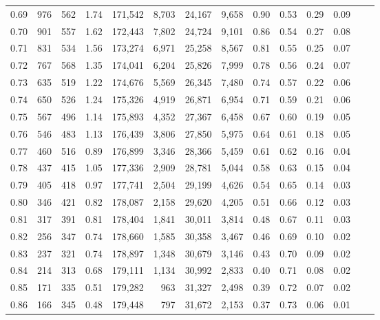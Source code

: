\begin{tabular}{rrrrrrrrrrrrrr}
0.69 &    976 &  562 &    1.74 &  171,542 &    8,703 &  24,167 &   9,658 &  0.90 &  0.53 &  0.29 &      0.09 \\
0.70 &    901 &  557 &    1.62 &  172,443 &    7,802 &  24,724 &   9,101 &  0.86 &  0.54 &  0.27 &      0.08 \\
0.71 &    831 &  534 &    1.56 &  173,274 &    6,971 &  25,258 &   8,567 &  0.81 &  0.55 &  0.25 &      0.07 \\
0.72 &    767 &  568 &    1.35 &  174,041 &    6,204 &  25,826 &   7,999 &  0.78 &  0.56 &  0.24 &      0.07 \\
0.73 &    635 &  519 &    1.22 &  174,676 &    5,569 &  26,345 &   7,480 &  0.74 &  0.57 &  0.22 &      0.06 \\
0.74 &    650 &  526 &    1.24 &  175,326 &    4,919 &  26,871 &   6,954 &  0.71 &  0.59 &  0.21 &      0.06 \\
0.75 &    567 &  496 &    1.14 &  175,893 &    4,352 &  27,367 &   6,458 &  0.67 &  0.60 &  0.19 &      0.05 \\
0.76 &    546 &  483 &    1.13 &  176,439 &    3,806 &  27,850 &   5,975 &  0.64 &  0.61 &  0.18 &      0.05 \\
0.77 &    460 &  516 &    0.89 &  176,899 &    3,346 &  28,366 &   5,459 &  0.61 &  0.62 &  0.16 &      0.04 \\
0.78 &    437 &  415 &    1.05 &  177,336 &    2,909 &  28,781 &   5,044 &  0.58 &  0.63 &  0.15 &      0.04 \\
0.79 &    405 &  418 &    0.97 &  177,741 &    2,504 &  29,199 &   4,626 &  0.54 &  0.65 &  0.14 &      0.03 \\
0.80 &    346 &  421 &    0.82 &  178,087 &    2,158 &  29,620 &   4,205 &  0.51 &  0.66 &  0.12 &      0.03 \\
0.81 &    317 &  391 &    0.81 &  178,404 &    1,841 &  30,011 &   3,814 &  0.48 &  0.67 &  0.11 &      0.03 \\
0.82 &    256 &  347 &    0.74 &  178,660 &    1,585 &  30,358 &   3,467 &  0.46 &  0.69 &  0.10 &      0.02 \\
0.83 &    237 &  321 &    0.74 &  178,897 &    1,348 &  30,679 &   3,146 &  0.43 &  0.70 &  0.09 &      0.02 \\
0.84 &    214 &  313 &    0.68 &  179,111 &    1,134 &  30,992 &   2,833 &  0.40 &  0.71 &  0.08 &      0.02 \\
0.85 &    171 &  335 &    0.51 &  179,282 &      963 &  31,327 &   2,498 &  0.39 &  0.72 &  0.07 &      0.02 \\
0.86 &    166 &  345 &    0.48 &  179,448 &      797 &  31,672 &   2,153 &  0.37 &  0.73 &  0.06 &      0.01 \\

\end{tabular}
